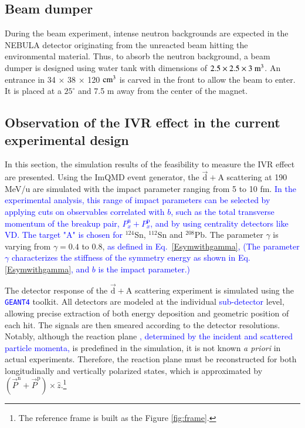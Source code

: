 \documentclass[twocolumn,twoside,showpacs,showkeys,preprintnumbers,superscriptaddress,amsmath,amssymb,prc,nofootinbib,a4paper]{revtex4}
\begin{document}
\subsection{Beam dumper} 

During the beam experiment, intense neutron backgrounds are expected in the NEBULA detector originating from the unreacted beam hitting the environmental material. Thus, to absorb the neutron background, a beam dumper is designed using water tank with dimensions of $2.5 \times 2.5 \times 3~{\rm m^3}$.  An entrance in 34 × 38 × 120 ${\rm cm^3}$ is carved in the front to allow the beam to enter. It is placed at a $25^{\circ}$  and 7.5 m away from the center of the magnet.



\subsection{Observation of the IVR effect in the current experimental design}

In this section, the simulation results of the feasibility to measure the IVR effect are presented. Using the ImQMD event generator, the $\vec{\mathrm{d}} +\mathrm{A}$ scattering at 190 MeV/u are simulated with the impact parameter ranging from 5 to 10 fm.  \textcolor{blue}{ In the experimental analysis, this range of impact parameters can be selected by applying cuts on observables correlated with $b$, such as the total transverse momentum of the breakup pair, $P_x^{\mathrm{n}}+P_x^{\mathrm{p}}$, and by using centrality detectors like VD. The target "A" is chosen for} $^{124}$Sn, $^{112}$Sn and $^{208}$Pb. The parameter $\gamma$ is varying from $\gamma=0.4$ to $0.8$, \textcolor{blue}{as defined in Eq.~\ref{Esymwithgamma},} 
\textcolor{blue}{(The parameter $\gamma$ characterizes the stiffness of the symmetry energy as shown in Eq. \ref{Esymwithgamma}, and $b$ is the impact parameter.)}

The detector response of the $\vec{\mathrm{d}} + \mathrm{A}$ scattering experiment is simulated using the \texttt{\textcolor{blue}{\texttt{GEANT4}}} toolkit. All detectors are modeled at the individual \textcolor{blue}{sub-detector} level, allowing precise extraction of both energy deposition and geometric position of each hit. The signals are then smeared according to the detector resolutions. Notably, although the reaction plane \textcolor{blue}{, determined  by the incident and scattered particle momenta,} is predefined in the simulation, it is not known \textit{a priori} in actual experiments. Therefore, the reaction plane must be reconstructed for both longitudinally and vertically polarized states, which is approximated by $\left(\vec{P}^{\mathrm{n}}+\vec{P}^{\mathrm{p}}\right) \times\hat{z}$.\footnote{The reference frame is built as the Figure \ref{fig:frame}.}
\end{document}

